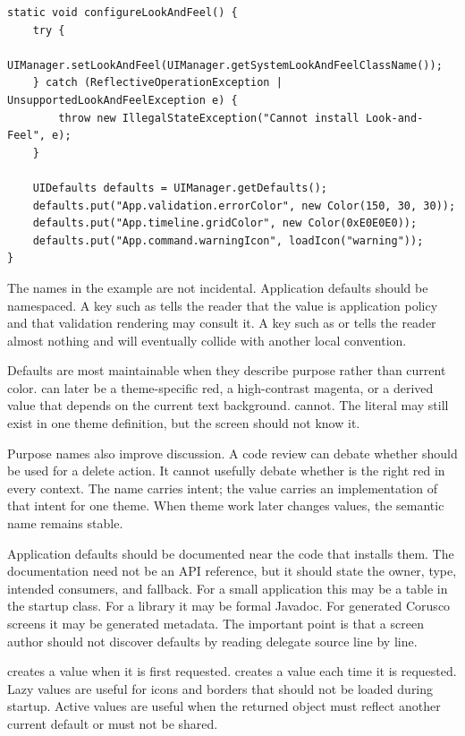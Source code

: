\begin{lstlisting}[caption={Installing application defaults after Look-and-Feel selection.}]
static void configureLookAndFeel() {
    try {
        UIManager.setLookAndFeel(UIManager.getSystemLookAndFeelClassName());
    } catch (ReflectiveOperationException | UnsupportedLookAndFeelException e) {
        throw new IllegalStateException("Cannot install Look-and-Feel", e);
    }

    UIDefaults defaults = UIManager.getDefaults();
    defaults.put("App.validation.errorColor", new Color(150, 30, 30));
    defaults.put("App.timeline.gridColor", new Color(0xE0E0E0));
    defaults.put("App.command.warningIcon", loadIcon("warning"));
}
\end{lstlisting}

The names in the example are not incidental. Application defaults should be namespaced. A key such as  tells the reader that the value is application policy and that validation rendering may consult it. A key such as  or  tells the reader almost nothing and will eventually collide with another local convention.

Defaults are most maintainable when they describe purpose rather than current color.  can later be a theme-specific red, a high-contrast magenta, or a derived value that depends on the current text background.  cannot. The literal may still exist in one theme definition, but the screen should not know it.

Purpose names also improve discussion. A code review can debate whether  should be used for a delete action. It cannot usefully debate whether  is the right red in every context. The name carries intent; the value carries an implementation of that intent for one theme. When theme work later changes values, the semantic name remains stable.

Application defaults should be documented near the code that installs them. The documentation need not be an API reference, but it should state the owner, type, intended consumers, and fallback. For a small application this may be a table in the startup class. For a library it may be formal Javadoc. For generated Corusco screens it may be generated metadata. The important point is that a screen author should not discover defaults by reading delegate source line by line.

 creates a value when it is first requested.  creates a value each time it is requested. Lazy values are useful for icons and borders that should not be loaded during startup. Active values are useful when the returned object must reflect another current default or must not be shared.

